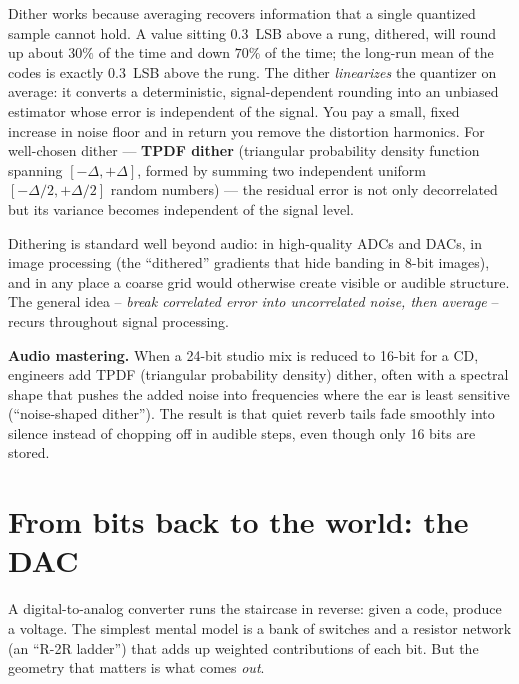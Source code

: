 \begin{whybox}
Dither works because averaging recovers information that a single quantized sample cannot hold.
A value sitting $0.3$~LSB above a rung, dithered, will round up about $30\%$ of the time and down
$70\%$ of the time; the long-run mean of the codes is exactly $0.3$~LSB above the rung. The dither
\emph{linearizes} the quantizer on average: it converts a deterministic, signal-dependent rounding
into an unbiased estimator whose error is independent of the signal. You pay a small, fixed
increase in noise floor and in return you remove the distortion harmonics. For
well-chosen dither --- \textbf{TPDF dither} (triangular probability density function spanning $[-\Delta,+\Delta]$, formed by summing two independent uniform $[-\Delta/2,+\Delta/2]$ random numbers) --- the residual error is not only
decorrelated but its variance becomes independent of the signal level.
\end{whybox}

Dithering is standard well beyond audio: in high-quality ADCs and DACs, in image
processing (the ``dithered'' gradients that hide banding in 8-bit images), and in any place a coarse
grid would otherwise create visible or audible structure. The general idea -- \emph{break correlated
error into uncorrelated noise, then average} -- recurs throughout signal processing.

\begin{applicationbox}
\textbf{Audio mastering.} When a 24-bit studio mix is reduced to 16-bit for a CD, engineers add
TPDF (triangular probability density) dither, often with a spectral shape that pushes the added
noise into frequencies where the ear is least sensitive (``noise-shaped dither''). The result is
that quiet reverb tails fade smoothly into silence instead of chopping off in audible steps, even
though only 16 bits are stored.
\end{applicationbox}

\section{From bits back to the world: the DAC}
\label{ch19:dac}

A digital-to-analog converter runs the staircase in reverse: given a code, produce a voltage. The
simplest mental model is a bank of switches and a resistor network (an ``R-2R ladder'') that adds up
weighted contributions of each bit. But the geometry that matters is what comes \emph{out}.

